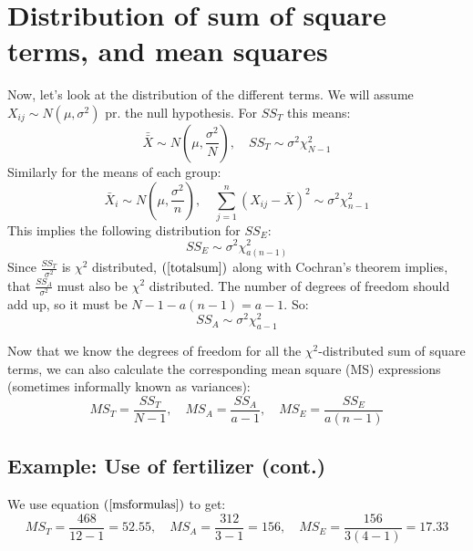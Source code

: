 \documentclass[12pt, a4paper]{article}
\newcommand*{\doublebar}[1]{\bar{\bar{#1}}}
\begin{document}
\section{Distribution of sum of square terms, and mean squares}
Now, let's look at the distribution of the different terms. We will assume $X_{ij}\sim N(\mu,\sigma^2)$ pr. the null hypothesis. For $SS_T$ this means:
\begin{equation}
\doublebar{X}\sim N\left(\mu,\frac{\sigma^2}{N}\right),\quad SS_T\sim\sigma^2\chi^2_{N-1}
\end{equation}
Similarly for the means of each group:
\begin{equation}
\bar{X}_i\sim N\left(\mu,\frac{\sigma^2}{n}\right),\quad\sum_{j=1}^n\left(X_{ij}-\bar{X}\right)^2\sim\sigma^2\chi^2_{n-1}
\end{equation}
This implies the following distribution for $SS_E$:
\begin{equation}
SS_E\sim\sigma^2\chi^2_{a(n-1)} 
\end{equation}
Since $\frac{SS_T}{\sigma^2}$ is $\chi^2$ distributed, $(\ref{totalsum})$ along with Cochran's theorem implies, that $\frac{SS_A}{\sigma^2}$ must also be $\chi^2$ distributed. The number of degrees of freedom should add up, so it must be $N-1-a(n-1)=a-1$. So:
\begin{equation}
SS_A\sim\sigma^2\chi^2_{a-1}
\end{equation}
\par
Now that we know the degrees of freedom for all the $\chi^2$-distributed sum of square terms, we can also calculate the corresponding mean square (MS) expressions (sometimes informally known as variances): 
\begin{equation}
\label{msformulas}
MS_T=\frac{SS_T}{N-1},\quad MS_A=\frac{SS_A}{a-1},\quad MS_E=\frac{SS_E}{a(n-1)}
\end{equation}

\subsection{Example: Use of fertilizer (cont.)}
We use equation $(\ref{msformulas})$ to get:
\begin{equation}
MS_T=\frac{468}{12-1}=52.55,\quad MS_A=\frac{312}{3-1}=156,\quad MS_E=\frac{156}{3(4-1)}=17.33
\end{equation}
\end{document}
